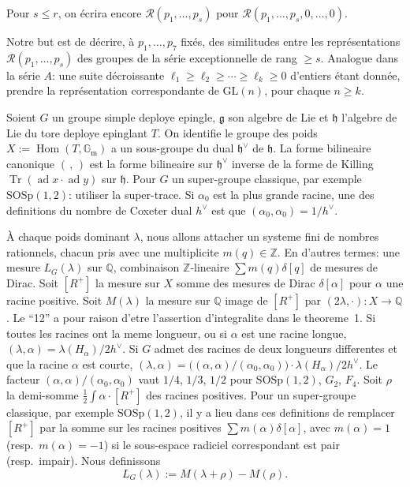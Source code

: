 \documentclass[11pt,a4paper]{article}
\theoremstyle{plain}
\theoremstyle{definition}
\DeclareMathOperator{\Tr}{Tr}
\DeclareMathOperator{\ad}{ad}
\DeclareMathOperator{\Hom}{Hom}
\begin{document}
Pour $s \leq r$, on \'ecrira encore $\mathcal{R}(p_1,\dots,p_s)$ pour $\mathcal{R}(p_1,\dots,p_s,0,\dots,0)$.

Notre but est de d\'ecrire, \`a $p_1,\dots,p_7$ fix\'es, des similitudes entre les repr\'esentations $\mathcal{R}(p_1,\dots,p_s)$ des groupes de la s\'erie exceptionnelle de rang $\geq s$. Analogue dans la s\'erie $A$: une suite d\'ecroissante $\ell_1 \geq \ell_2 \geq \cdots \geq \ell_k \geq 0$ d'entiers \'etant donn\'ee, prendre la repr\'esentation correspondante de $\mathrm{GL}(n)$, pour chaque $n \geq k$.

\bigskip

Soient $G$ un groupe simple deploye epingle, $\mathfrak{g}$ son algebre de Lie et $\mathfrak{h}$ l'algebre de Lie du tore deploye epinglant $T$. On identifie le groupe des poids $X := \Hom(T,\mathbb{G}_\mathrm{m})$ a un sous-groupe du dual $\mathfrak{h}^\vee$ de $\mathfrak{h}$. La forme bilineaire canonique $(\, , \,)$ est la forme bilineaire sur $\mathfrak{h}^\vee$ inverse de la forme de Killing $\Tr(\ad x \cdot \ad y)$ sur $\mathfrak{h}$. Pour $G$ un super-groupe classique, par exemple $\mathrm{SOSp}(1,2)$: utiliser la super-trace. Si $\alpha_0$ est la plus grande racine, une des definitions du nombre de Coxeter dual $h^\vee$ est que $(\alpha_0,\alpha_0) = 1/h^\vee$.

\`A chaque poids dominant $\lambda$, nous allons attacher un systeme fini de nombres rationnels, chacun pris avec une multiplicite $m(q) \in \mathbb{Z}$. En d'autres termes: une mesure $L_G(\lambda)$ sur $\mathbb{Q}$, combinaison $\mathbb{Z}$-lineaire $\sum m(q)\delta[q]$ de mesures de Dirac. Soit $[R^+]$ la mesure sur $X$ somme des mesures de Dirac $\delta[\alpha]$ pour $\alpha$ une racine positive. Soit $M(\lambda)$ la mesure sur $\mathbb{Q}$ image de $[R^+]$ par $(2\lambda, \cdot): X \to \mathbb{Q}$. Le ``12'' a pour raison d'etre l'assertion d'integralite dans le theoreme~1. Si toutes les racines ont la meme longueur, ou si $\alpha$ est une racine longue, $(\lambda,\alpha) = \lambda(H_\alpha)/2h^\vee$. Si $G$ admet des racines de deux longueurs differentes et que la racine $\alpha$ est courte, $(\lambda,\alpha) = \bigl((\alpha,\alpha)/(\alpha_0,\alpha_0)\bigr) \cdot \lambda(H_\alpha)/2h^\vee$. Le facteur $(\alpha,\alpha)/(\alpha_0,\alpha_0)$ vaut $1/4$, $1/3$, $1/2$ pour $\mathrm{SOSp}(1,2)$, $G_2$, $F_4$. Soit $\rho$ la demi-somme $\frac{1}{2}\int \alpha \cdot [R^+]$ des racines positives. Pour un super-groupe classique, par exemple $\mathrm{SOSp}(1,2)$, il y a lieu dans ces definitions de remplacer $[R^+]$ par la somme sur les racines positives $\sum m(\alpha)\delta[\alpha]$, avec $m(\alpha) = 1$ (resp.\ $m(\alpha) = -1$) si le sous-espace radiciel correspondant est pair (resp.\ impair). Nous definissons
\begin{equation}\label{eq:1}
L_G(\lambda) := M(\lambda+\rho) - M(\rho).
\end{equation}
\end{document}

